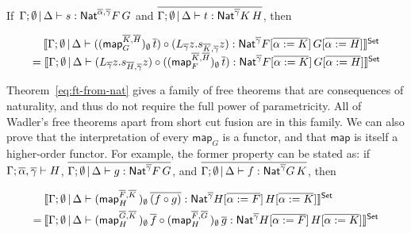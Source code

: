 \documentclass[runningheads]{llncs}
\newcommand{\map}{\mathsf{map}}
\begin{document}
  \vspace*{-0.1in}
  
\begin{theorem}\label{eq:ft-from-nat} 
  If\, $\Gamma; \emptyset \,|\, \Delta \vdash s : \mathsf{Nat}^{\overline{\alpha},
  \overline{\gamma}} F\,G$ and $\overline{\Gamma; \emptyset \,|\,
  \Delta \vdash t : \mathsf{Nat}^{\overline{\gamma}} K\, H}$, then

    \vspace*{-0.25in}
  
  \[\begin{array}{l}
  \hspace*{0.135in}
\setsem{\Gamma; \emptyset\,|\, \Delta
  \vdash 
  ((\map_G^{\overline{K}, \overline{H}})_\emptyset \,\overline{t}) \circ
(L_{\overline{\gamma}} z. s_{\overline{K}, \overline{\gamma}}
  z)
  : \Nat^{\overline{\gamma}} F[\overline{\alpha := K}]\,
  G[\overline{\alpha := H}]}\\
= \setsem{ \Gamma; \emptyset \,|\, \Delta \vdash
(L_{\overline{\gamma}} z.
  s_{\overline{H}, \overline{\gamma}} z)\circ
  ((\map_F^{\overline{K}, \overline{H}})_\emptyset \,
  \overline{t})  : \Nat^{\overline{\gamma}} F[\overline{\alpha :=
      K}]\, G[\overline{\alpha := H}]}
\end{array}\]
\end{theorem}

  \vspace*{-0.1in}
  
\noindent
Theorem~\ref{eq:ft-from-nat} gives a family of free theorems that are
consequences of naturality, and thus do not require the full power of
parametricity. All of Wadler's free theorems apart from short cut
fusion are in this family. We can also prove that the interpretation
of every $\map_G$ is a functor, and that $\map$ is itself a
higher-order functor. For example, the former property can be stated as:
  if 
$\Gamma; \overline{\alpha}, \overline{\gamma} \vdash H$, 
  $\overline{\Gamma; \emptyset \,|\, \Delta \vdash g : \mathsf{Nat}^{\overline{\gamma}} F \, G}$, and
  $\overline{\Gamma; \emptyset \,|\, \Delta \vdash f : \mathsf{Nat}^{\overline{\gamma}} G \, K}$, then

  \vspace*{-0.25in}
  
  \begin{align*}
&\setsem{
\Gamma; \emptyset \,|\, \Delta \vdash 
  (\map^{\ol{F}, \ol{K}}_H \,)_{\emptyset} \, \ol{(f \circ g)}
  : \Nat^{\ol\gamma} H[\ol{\alpha := F}] \, H[\ol{\alpha := K}]} \\ 
= \hspace{0.03in} 
  &\setsem{
  \Gamma; \emptyset \,|\, \Delta \vdash 
  (\map^{\ol{G}, \ol{K}}_H \,)_{\emptyset} \, \ol{f} \circ 
  (\map^{\ol{F}, \ol{G}}_H \,)_{\emptyset} \, \ol{g}
  : \Nat^{\ol\gamma} H[\ol{\alpha := F}] \, H[\ol{\alpha := K}]}
\end{align*}
\end{document}
